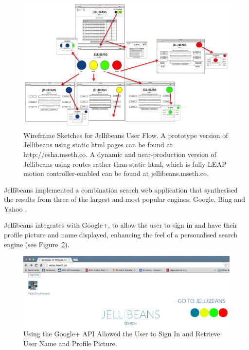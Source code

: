 \documentclass[a4paper, 11pt]{article}
\begin{document}
\begin{figure}[H]
\begin{center}
\includegraphics[scale=0.65]{JellibeanUserFlow.png}
\end{center}
\caption{Wireframe Sketches for Jellibeans User Flow. A prototype version of Jellibeans using static html pages can be found at http://esha.mseth.co. A dynamic and near-production version of Jellibeans using routes rather than static html, which is fully LEAP motion controller-enabled can be found at jellibeans.mseth.co. }
\label{JBeanUserFlow}
\end{figure}

\vspace{5mm}
Jellibeans implemented a combination search web application that synthesised the results from three of the largest and most popular engines; Google, Bing and Yahoo \cite{adam}.

\vspace{5mm}

Jellibeans integrates with Google+, to allow the user to sign in and have their profile picture and name displayed, enhancing the feel of a personalised search engine (see Figure~\ref{googlesignin}).

\begin{figure}[H]
\begin{center}
\includegraphics[scale=0.25]{helloEsha}
\end{center}
\caption{Using the Google+ API Allowed the User to Sign In and Retrieve User Name and Profile Picture.}
\label{googlesignin}
\end{figure}
\end{document}

